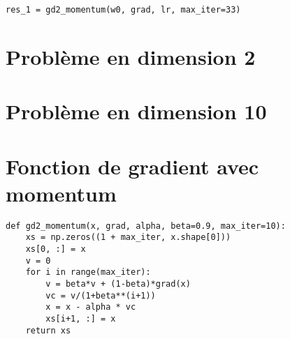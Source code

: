 \documentclass[12pt]{article}
\begin{document}
\begin{lstlisting}
res_1 = gd2_momentum(w0, grad, lr, max_iter=33)
\end{lstlisting}


\section{Problème en dimension 2}

\section{Problème en dimension 10}

\section*{Fonction de gradient avec momentum}

\begin{lstlisting}
def gd2_momentum(x, grad, alpha, beta=0.9, max_iter=10):
    xs = np.zeros((1 + max_iter, x.shape[0]))
    xs[0, :] = x
    v = 0
    for i in range(max_iter):
        v = beta*v + (1-beta)*grad(x)
        vc = v/(1+beta**(i+1))
        x = x - alpha * vc
        xs[i+1, :] = x
    return xs
\end{lstlisting}
\end{document}
